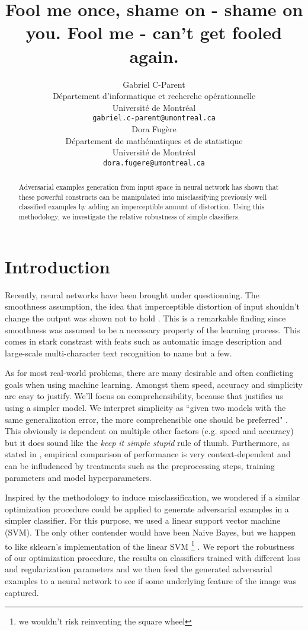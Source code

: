 \documentclass{article} %
\title{Fool me once, shame on - shame on you. \newline
       Fool me - can't get fooled again.}
\author{
Gabriel C-Parent\\
Département d’informatique et recherche opérationnelle\\
Université de Montréal\\
\texttt{gabriel.c-parent@umontreal.ca} \\
\And
Dora Fugère \\
Département de mathématiques et de statistique \\
Université de Montréal\\
\texttt{dora.fugere@umontreal.ca} \\
}
\begin{document}
\maketitle

\begin{abstract}
Adversarial examples generation from input space in neural network
has shown that these powerful constructs can be manipulated into misclassifying
previously well classified examples by adding an imperceptible amount of
distortion. Using this methodology, we investigate the relative robustness of
simple classifiers.
\end{abstract}


\section{Introduction}

Recently, neural networks have been brought under questionning. The smoothness
assumption, the idea that imperceptible distortion of input shouldn't change
the output was shown not to hold \citep{szegedy_intriguing_2013}. This is a
remarkable finding since smoothness was assumed to be a necessary property of the
learning process.
This comes in stark constrast with feats such as automatic image description
\citep{vinyals_show_2014} and large-scale multi-character text recognition
\citep{goodfellow_multi-digit_2013} to name but a few.

As for most real-world problems, there are many desirable and often conflicting
goals when using machine learning. Amongst them speed, accuracy and simplicity
are easy to justify. We'll focus on comprehensibility, because that justifies
us using a simpler model.
We interpret simplicity as ``given two models with the same generalization error, the more
comprehensible one should be preferred" \citep{domingos_role_1999}.
This obviously is dependent on multiple other factors (e.g. speed and accuracy)
but it does sound like the \textit{keep it simple stupid} rule of thumb.
Furthermore, as stated in \citep{hand_classifier_2006}, empirical comparison of
performance is very context-dependent and can be infludenced by treatments such 
as the preprocessing steps, training parameters and model hyperparameters.

Inspired by the methodology to induce misclassification, we wondered
if a similar optimization procedure could be applied to generate adversarial
examples in a simpler classifier. For this purpose, we used a linear support
vector machine (SVM). The only other contender would have been Naive Bayes,
but we happen to like sklearn's implementation of the linear SVM \footnote{we wouldn't
risk reinventing the square wheel} \citep{pedregosa_scikit-learn:_2011}.
We report the robustness of our optimization procedure, the results on classifiers
trained with different loss and regularization parameters and we then feed the 
generated adversarial examples to a neural network to see if some underlying
feature of the image was captured.
\end{document}

